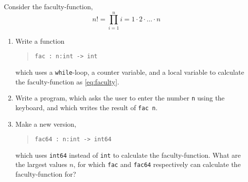 Consider the faculty-function,
\begin{equation}
  n! = \prod_{i=1}^n i = 1\cdot 2\cdot \ldots \cdot n
  \label{eq:faculty}
\end{equation}
\begin{enumerate}
\item Write a function
  \begin{quote}
    \mbox{\lstinline!fac : n:int -> int!}
  \end{quote}
  which uses a \lstinline!while!-loop, a counter variable, and a local
  variable to calculate the faculty-function as \eqref{eq:faculty}.
  \item Write a program, which asks the user to enter the number
    \lstinline!n! using the keyboard, and which writes the result of \lstinline!fac n!.
  \item Make a new version, 
    \begin{quote}
      \mbox{\lstinline!fac64 : n:int -> int64!}
    \end{quote}
    which uses \lstinline{int64} instead of \lstinline{int} to
    calculate the faculty-function. What are the largest values $n$,
    for which \lstinline{fac} and \lstinline{fac64} respectively can
    calculate the faculty-function for?
  \end{enumerate}
